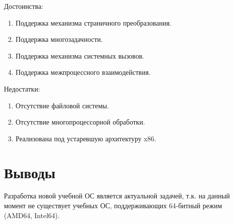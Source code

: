 Достоинства:
\begin{enumerate}[1.]
\item Поддержка механизма страничного преобразования.
\item Поддержка многозадачности.
\item Поддержка механизма системных вызовов.
\item Поддержка межпроцессного взаимодействия.
\end{enumerate}

Недостатки:
\begin{enumerate}[1.]
\item Отсутствие файловой системы.
\item Отсутствие многопроцессорной обработки.
\item Реализована под устаревшую архитектуру x86.
\end{enumerate}


\section{Выводы}
Разработка новой учебной ОС является актуальной задачей, т.к. на данный момент не существует учебных ОС,
поддерживающих 64-битный режим (AMD64, Intel64).
